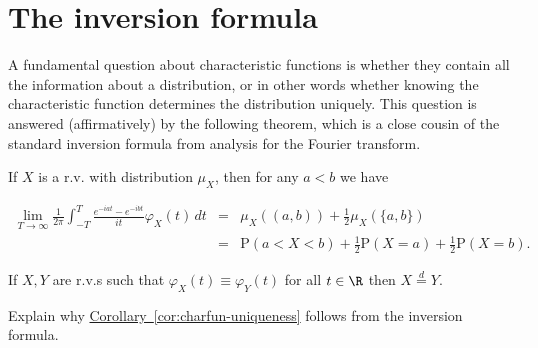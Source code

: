 \section{The inversion formula}

A fundamental question about characteristic functions
is whether they contain all the information about a
distribution, or in other words whether knowing the
characteristic function determines the distribution
uniquely. This question is answered (affirmatively) by
the following theorem, which is a close cousin of the
standard inversion formula from analysis for the
Fourier transform.

\begin{thm}
\label{thm-inversion}
If $X$ is a r.v. with distribution $\mu_X$, then for
any $a<b$ we have

\begin{eqnarray*} \lim_{T\to\infty} \frac{1}{2\pi} \int_{-T}^T \frac{e^{-iat}-e^{-ibt}}{it}\varphi_X(t)\,dt &=& \mu_X((a,b)) + \frac12
\mu_X(\{a,b\}) \\ &=& \mathrm{P}(a<X<b) + \frac12 \mathrm{P}(X=a)+\frac12 \mathrm{P}(X=b).
\end{eqnarray*}

\end{thm}

\begin{cor}
\label{cor:charfun-uniqueness}
If $X,Y$ are r.v.s such that
$\varphi_X(t)\equiv \varphi_Y(t)$ for all $t\in\R$
then $X \stackrel{d}{=} Y$.
\end{cor}

\begin{xexercise}
Explain why \hyperref[cor:charfun-uniqueness]{Corollary~\ref*{cor:charfun-uniqueness}}
follows from the inversion formula.
\end{xexercise}

